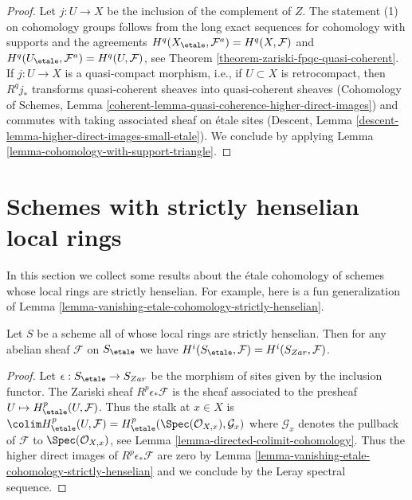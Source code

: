 \begin{proof}
Let $j : U \to X$ be the inclusion of the complement of $Z$.
The statement (1) on cohomology groups follows from the long
exact sequences for cohomology with supports and the agreements
$H^q(X_\etale, \mathcal{F}^a) = H^q(X, \mathcal{F})$ and
$H^q(U_\etale, \mathcal{F}^a) = H^q(U, \mathcal{F})$, see
Theorem \ref{theorem-zariski-fpqc-quasi-coherent}.
If $j : U \to X$ is a quasi-compact morphism, i.e., if $U \subset X$
is retrocompact, then $R^qj_*$ transforms quasi-coherent sheaves
into quasi-coherent sheaves
(Cohomology of Schemes, Lemma
\ref{coherent-lemma-quasi-coherence-higher-direct-images})
and commutes with taking associated
sheaf on \'etale sites
(Descent, Lemma \ref{descent-lemma-higher-direct-images-small-etale}).
We conclude by applying
Lemma \ref{lemma-cohomology-with-support-triangle}.
\end{proof}







\section{Schemes with strictly henselian local rings}
\label{section-strictly-henselian-local-rings}

\noindent
In this section we collect some results about the \'etale cohomology
of schemes whose local rings are strictly henselian. For example,
here is a fun generalization of
Lemma \ref{lemma-vanishing-etale-cohomology-strictly-henselian}.

\begin{lemma}
\label{lemma-local-rings-strictly-henselian}
Let $S$ be a scheme all of whose local rings are strictly henselian.
Then for any abelian sheaf $\mathcal{F}$ on $S_\etale$ we have
$H^i(S_\etale, \mathcal{F}) = H^i(S_{Zar}, \mathcal{F})$.
\end{lemma}

\begin{proof}
Let $\epsilon : S_\etale \to S_{Zar}$ be the morphism of sites given
by the inclusion functor. The Zariski sheaf $R^p\epsilon_*\mathcal{F}$
is the sheaf associated to the presheaf $U \mapsto H^p_\etale(U, \mathcal{F})$.
Thus the stalk at $x \in X$ is
$\colim H^p_\etale(U, \mathcal{F}) =
H^p_\etale(\Spec(\mathcal{O}_{X, x}), \mathcal{G}_x)$
where $\mathcal{G}_x$ denotes the pullback of $\mathcal{F}$
to $\Spec(\mathcal{O}_{X, x})$, see
Lemma \ref{lemma-directed-colimit-cohomology}.
Thus the higher direct images of $R^p\epsilon_*\mathcal{F}$ are
zero by
Lemma \ref{lemma-vanishing-etale-cohomology-strictly-henselian}
and we conclude by the Leray spectral sequence.
\end{proof}


